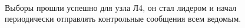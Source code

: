 \documentclass[subf, href, colorlinks=true, 14pt,
times, mtpro, specialist]{disser}
\theoremstyle{definition}
\begin{document}
\begin{figure}[H]
\begin{minipage}[h]{0.46\linewidth}
 \\
\begin{small}
Выборы прошли успешно для узла Л4, он стал лидером и начал периодически отправлять контрольные сообщения всем ведомым.
\end{small}
\end{minipage}
\caption{}
\label{fig:init}
\end{figure}
\end{document}
